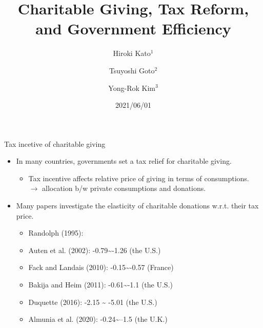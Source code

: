 \documentclass[
  ignorenonframetext,
]{beamer}
\title{Charitable Giving, Tax Reform, and Government Efficiency}
\author{ Hiroki Kato\(^1\)\and Tsuyoshi Goto\(^2\)\and Yong-Rok Kim\(^3\)}
\institute{\(^1\)Osaka University\and\(^2\)Chiba University\and\(^3\)Kobe University}
\date{2021/06/01}
\providecommand{\tightlist}{%
  \setlength{\itemsep}{0pt}\setlength{\parskip}{0pt}}
\begin{document}
\frame{\titlepage}

\begin{frame}
\end{frame}

\begin{frame}{Tax incetive of charitable giving}
\protect\hypertarget{tax-incetive-of-charitable-giving}{}
\begin{itemize}
\tightlist
\item
  In many countries, governments set a tax relief for charitable giving.

  \begin{itemize}
  \tightlist
  \item
    Tax incentive affects relative price of giving in terms of consumptions. \(\to\) allocation b/w private consumptions and donations.
  \end{itemize}
\item
  Many papers investigate the elasticity of charitable donations w.r.t. their tax price.

  \begin{itemize}
  \tightlist
  \item
    Randolph (1995):
  \item
    Auten et al. (2002): -0.79\textasciitilde-1.26 (the U.S.)
  \item
    Fack and Landais (2010): -0.15\textasciitilde-0.57 (France)
  \item
    Bakija and Heim (2011): -0.61\textasciitilde-1.1 (the U.S.)
  \item
    Duquette (2016): -2.15 \textasciitilde{} -5.01 (the U.S.)
  \item
    Almunia et al. (2020): -0.24\textasciitilde--1.5 (the U.K.)
  \end{itemize}
\end{itemize}
\end{frame}
\end{document}
